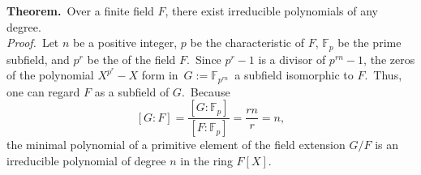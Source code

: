 \documentclass[12pt]{article}
\theoremstyle{definition}
\begin{document}
\textbf{Theorem.}\, Over a finite field $F$, there exist irreducible polynomials of any degree.\\

{\em Proof.}\, Let $n$ be a positive integer, $p$ be the characteristic of $F$, $\mathbb{F}_p$ be the prime subfield, and $p^r$ be the  of the field $F$.\, Since $p^r\!-\!1$ is a divisor of $p^{rn}\!-\!1$, the zeros of the polynomial $X^{p^r}\!-\!X$ form in\, $G := \mathbb{F}_{p^{rn}}$\, a subfield isomorphic to $F$.\, Thus, one can regard $F$ as a subfield of $G$.\, Because
$$[G\!:\!F] = \frac{[G\!:\!\mathbb{F}_p]}{[F\!:\!\mathbb{F}_p]} = \frac{rn}{r} = n,$$
the minimal polynomial of a primitive element of the field extension $G/F$ is an irreducible polynomial of degree $n$ in the ring $F[X].$
\end{document}
